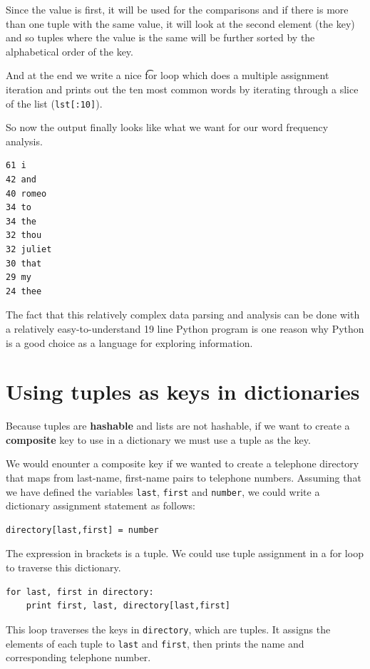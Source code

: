 \documentclass[10pt]{book}
\begin{document}
Since the value is first, it will be used for the comparisons and 
if there is more than one tuple with the same value, it will look
at the second element (the key) and so tuples where the value is the
same will be further sorted by the alphabetical order of the key.

And at the end we write a nice {\t for loop} which does a multiple
assignment iteration and prints out the ten most common words
by iterating through a slice of the list ({\tt lst[:10]}).

So now the output finally looks like what we want for our word 
frequency analysis.

\beforeverb
\begin{verbatim}
61 i
42 and
40 romeo
34 to
34 the
32 thou
32 juliet
30 that
29 my
24 thee
\end{verbatim}
\afterverb
%
The fact that this relatively complex data parsing and analysis 
can be done with a relatively easy-to-understand 19 line Python
program is one reason why Python is a good choice as a language 
for exploring information.

\section{Using tuples as keys in dictionaries}


Because tuples are {\bf hashable} and lists are not hashable, if we want to 
create a {\bf composite} key to use in a dictionary we must use a tuple as
the key.

We would enounter a composite key if we wanted to create a 
telephone directory that maps
from last-name, first-name pairs to telephone numbers.  Assuming
that we have defined the variables 
{\tt last}, {\tt first} and {\tt number}, we could write
a dictionary assignment statement as follows:

\beforeverb
\begin{verbatim}
directory[last,first] = number
\end{verbatim}
\afterverb
%
The expression in brackets is a tuple.  We could use tuple
assignment in a for loop to traverse this dictionary.


\beforeverb
\begin{verbatim}
for last, first in directory:
    print first, last, directory[last,first]
\end{verbatim}
\afterverb
%
This loop traverses the keys in {\tt directory}, which are tuples.  It
assigns the elements of each tuple to {\tt last} and {\tt first}, then
prints the name and corresponding telephone number.
\end{document}
